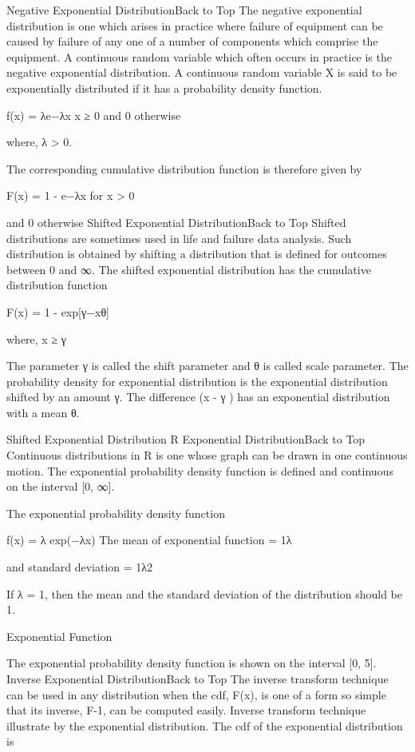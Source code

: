 \documentclass{beamer}
\begin{document}
	
	Negative Exponential DistributionBack to Top
	The negative exponential distribution is one which arises in practice where failure of equipment can be caused by failure of any one of a number of components which comprise the equipment. A continuous random variable which often occurs in practice is the negative exponential distribution. A continuous random variable X is said to be exponentially distributed if it has a probability density function. 
	
	f(x) = λe−λx x ≥ 0
	and 0 otherwise
	
	where, λ > 0. 
	
	The corresponding cumulative distribution function is therefore given by
	
	F(x) = 1 - e−λx for x > 0 
	
	and 0 otherwise
	Shifted Exponential DistributionBack to Top
	Shifted distributions are sometimes used in life and failure data analysis. Such distribution is obtained by shifting a distribution that is defined for outcomes between 0 and ∞. The shifted exponential distribution has the cumulative distribution function
	
	F(x) = 1 - exp[γ−xθ]
	
	where, x ≥ γ
	
	The parameter γ is called the shift parameter and θ is called scale parameter. The probability density for exponential distribution is the exponential distribution shifted by an amount γ. The difference (x - γ ) has an exponential distribution with a mean θ.
	
	Shifted Exponential Distribution
	R Exponential DistributionBack to Top
	Continuous distributions in R is one whose graph can be drawn in one continuous motion. The exponential probability density function is defined and continuous on the interval [0, ∞].
	
	The exponential probability density function
	
	f(x) = λ exp(−λx)
	The mean of exponential function = 1λ 
	
	and standard deviation = 1λ2 
	
	If λ = 1, then the mean and the standard deviation of the distribution should be 1.
	
	Exponential Function
	
	The exponential probability density function is shown on the interval [0, 5].
	Inverse Exponential DistributionBack to Top
	The inverse transform technique can be used in any distribution when the cdf, F(x), is one of a form so simple that its inverse, F-1, can be computed easily. Inverse transform technique illustrate by the exponential distribution. The cdf of the exponential distribution is
	
\end{document}
